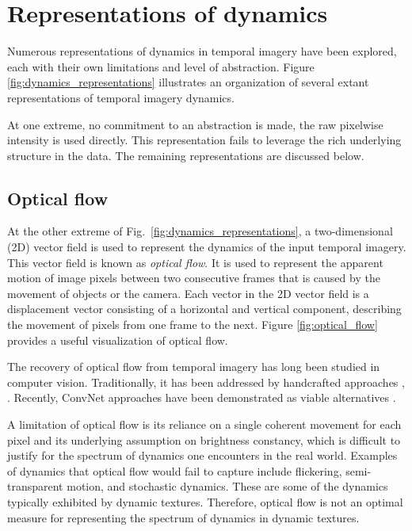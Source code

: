 \section{Representations of dynamics}

Numerous representations of dynamics in temporal imagery have been explored, each with their own limitations and level of abstraction. Figure \ref{fig:dynamics_representations} illustrates an organization of several extant representations of temporal imagery dynamics.

At one extreme, no commitment to an abstraction is made, the raw pixelwise intensity is used directly. This representation fails to leverage the rich underlying structure in the data. The remaining representations are discussed below.

\subsection{Optical flow}

At the other extreme of Fig.\ \ref{fig:dynamics_representations}, a two-dimensional (2D) vector field is used to represent the dynamics of the input temporal imagery. This vector field is known as \emph{optical flow}. It is used to represent the apparent motion of image pixels between two consecutive frames that is caused by the movement of objects or the camera. Each vector in the 2D vector field is a displacement vector consisting of a horizontal and vertical component, describing the movement of pixels from one frame to the next. Figure \ref{fig:optical_flow} provides a useful visualization of optical flow.

The recovery of optical flow from temporal imagery has long been studied in computer vision. Traditionally, it has been addressed by handcrafted approaches \eg, \cite{horn1981,lucas1981,revaud2015epicflow}. Recently, ConvNet approaches have been demonstrated as viable alternatives \cite{dosovitskiy2015,ilg2017,ranjan2017,yu2016}.

A limitation of optical flow is its reliance on a single coherent movement for each pixel and its underlying assumption on brightness constancy, which is difficult to justify for the spectrum of dynamics one encounters in the real world. Examples of dynamics that optical flow would fail to capture include flickering, semi-transparent motion, and stochastic dynamics. These are some of the dynamics typically exhibited by dynamic textures. Therefore, optical flow is not an optimal measure for representing the spectrum of dynamics in dynamic textures.

